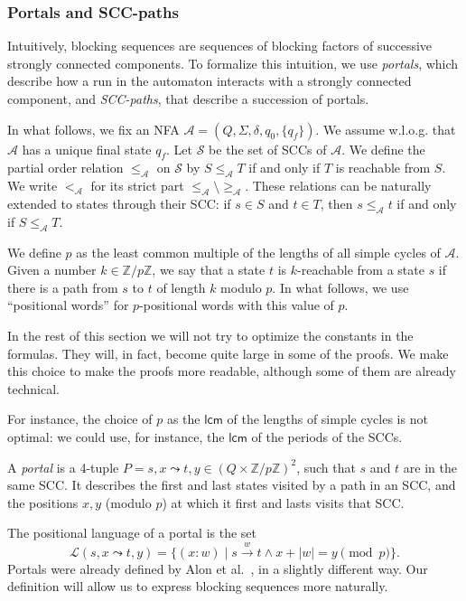 \documentclass[letterpaper, USenglish, cleveref, autoref, thm-restate, numberwithinsect]{lipics-v2021}
\theoremstyle{theorem}
\theoremstyle{definition}
\newcommand{\Aa}{\mathcal{A}}
\newcommand{\curly}{\mathrel{\leadsto}}
\newcommand{\lcm}{\mathsf{lcm}}
\newcommand{\portal}[4]{#1,#2 \curly #3, #4}
\newcommand{\SCCset}{\mathscr{S}}
\newcommand{\set}[1]{\{ #1 \}}
\newcommand{\timedlanguage}[4]{\mathcal{L}(\portal{#1}{#2}{#3}{#4})}
\newcommand{\ZZ}{\mathbb{Z}}
\begin{document}
\subsubsection{Portals and SCC-paths}

Intuitively, blocking sequences are sequences of blocking factors of successive strongly connected components. To formalize this intuition, we use \emph{portals}, which describe how a run in the automaton interacts with a strongly connected component, and \emph{SCC-paths}, that describe a succession of portals.

In what follows, we fix an NFA $\Aa = (Q, \Sigma, \delta, q_{0}, \set{q_f})$.
We assume w.l.o.g. that $\Aa$ has a unique final state $q_f$.
Let $\SCCset$ be the set of SCCs of $\Aa$.
We define the partial order relation $\leq_\Aa$ on $\SCCset$ by $S \leq_\Aa T$ if and only if $T$ is reachable from $S$.  We write $<_\Aa$ for its strict part $\leq_\Aa \setminus \geq_\Aa$. These relations can be naturally extended to states through their SCC: if $s\in S$ and $t\in T$, then $s\leq_\Aa t$ if and only if $S\leq_\Aa T$.

We define $p$ as the least common multiple of the lengths of all simple cycles of $\Aa$.
Given a number $k \in \ZZ/p\ZZ$, we say that a state $t$ is $k$-reachable from a state $s$ if there is a path from $s$ to $t$ of length $k$ modulo $p$.
In what follows, we use ``positional words'' for $p$-positional words with this value of $p$.

\begin{remark}
	In the rest of this section we will not try to optimize the constants in the formulas. They will, in fact, become quite large in some of the proofs.
	We make this choice to make the proofs more readable, although some of them are already technical.
	
	For instance, the choice of $p$ as the $\lcm$ of the lengths of simple cycles is not optimal: we could use, for instance, the $\lcm$ of the periods of the SCCs.
\end{remark}


\begin{definition}[Portal]
	A \emph{portal} is a 4-tuple $P = \portal{s}{x}{t}{y} \in (Q \times \ZZ/p\ZZ)^2$, such that $s$ and $t$ are in the same SCC. 
	It describes the first and last states visited by a path in an SCC, and the positions $x,y$ (modulo $p$) at which it first and lasts visits that SCC.
\end{definition}


The positional language of a portal is the set \[\timedlanguage{s}{x}{t}{y} = \set{(x:w) \mid s\xrightarrow{w}t \land x+|w| = y \pmod{p}}.\]
Portals were already defined by Alon et al.~\cite{alon2001regular}, in a slightly different way.
Our definition will allow us to express blocking sequences more naturally.
\end{document}
